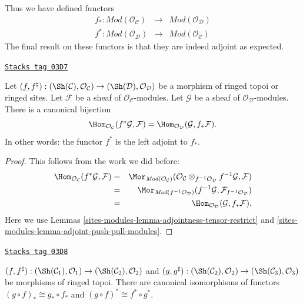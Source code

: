 Thus we have defined functors
\begin{eqnarray*}
f_* : \textit{Mod}(\mathcal{O}_\mathcal{C})
& \longrightarrow &
\textit{Mod}(\mathcal{O}_\mathcal{D}) \\
f^* : \textit{Mod}(\mathcal{O}_\mathcal{D})
& \longrightarrow &
\textit{Mod}(\mathcal{O}_\mathcal{C})
\end{eqnarray*}
The final result on these functors is that they are indeed
adjoint as expected.

\begin{lemma}
\label{sites-modules-lemma-adjoint-pullback-pushforward-modules}
\href{https://stacks.math.columbia.edu/tag/03D7}{\texttt{Stacks tag 03D7}}

Let
$(f, f^\sharp) :
(\Sh(\mathcal{C}), \mathcal{O}_\mathcal{C})
\to
(\Sh(\mathcal{D}), \mathcal{O}_\mathcal{D})$
be a morphism of ringed topoi or ringed sites.
Let $\mathcal{F}$ be a sheaf of $\mathcal{O}_\mathcal{C}$-modules.
Let $\mathcal{G}$ be a sheaf of $\mathcal{O}_\mathcal{D}$-modules.
There is a canonical bijection
$$
\Hom_{\mathcal{O}_\mathcal{C}}(f^*\mathcal{G}, \mathcal{F})
=
\Hom_{\mathcal{O}_\mathcal{D}}(\mathcal{G}, f_*\mathcal{F}).
$$
In other words: the functor $f^*$ is the left adjoint to
$f_*$.
\end{lemma}

\begin{proof}
This follows from the work we did before:
\begin{eqnarray*}
\Hom_{\mathcal{O}_\mathcal{C}}(f^*\mathcal{G}, \mathcal{F})
& = &
\Mor_{\textit{Mod}(\mathcal{O}_\mathcal{C})}(
\mathcal{O}_\mathcal{C}
\otimes_{f^{-1}\mathcal{O}_\mathcal{D}} f^{-1}\mathcal{G},
\mathcal{F}) \\
& = &
\Mor_{\textit{Mod}(f^{-1}\mathcal{O}_\mathcal{D})}(
f^{-1}\mathcal{G}, \mathcal{F}_{f^{-1}\mathcal{O}_\mathcal{D}}) \\
& = &
\Hom_{\mathcal{O}_\mathcal{D}}(\mathcal{G}, f_*\mathcal{F}).
\end{eqnarray*}
Here we use Lemmas \ref{sites-modules-lemma-adjointness-tensor-restrict}
and \ref{sites-modules-lemma-adjoint-push-pull-modules}.
\end{proof}

\begin{lemma}
\label{sites-modules-lemma-push-pull-composition-modules}
\href{https://stacks.math.columbia.edu/tag/03D8}{\texttt{Stacks tag 03D8}}

$(f, f^\sharp) :
(\Sh(\mathcal{C}_1), \mathcal{O}_1)
\to (\Sh(\mathcal{C}_2), \mathcal{O}_2)$ and
$(g, g^\sharp) :
(\Sh(\mathcal{C}_2), \mathcal{O}_2) \to
(\Sh(\mathcal{C}_3), \mathcal{O}_3)$
be morphisms of ringed topoi.
There are canonical isomorphisms of functors
$(g \circ f)_* \cong g_* \circ f_*$ and
$(g \circ f)^* \cong f^* \circ g^*$.
\end{lemma}

